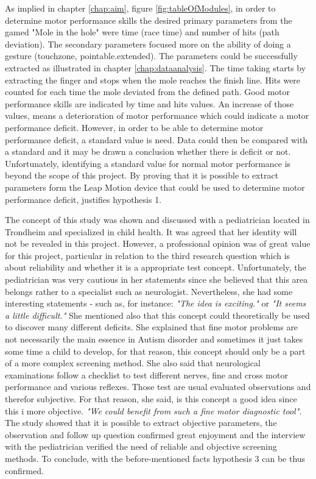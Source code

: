As implied in chapter \ref{chap:aim}, figure \ref{fig:tableOfModules}, in order to determine motor performance skills
the desired primary parameters from the gamed "Mole in the hole" were time (race time) and number of hits (path deviation). The secondary parameters focused more on the ability of doing a gesture (touchzone, pointable.extended). The parameters could be successfully extracted as illustrated in chapter \ref{chap:dataanalysis}. The time taking starts by extracting the finger and stops when the mole reaches the finish line. Hits were counted for each time the mole deviated from the defined path. Good motor performance skills are indicated by time and hits values. An increase of those values, means a deterioration of motor performance which could indicate a motor performance deficit. However, in order to be able to determine motor performance deficit, a standard value is need. Data could then be compared with a standard and it may be drawn a conclusion whether there is deficit or not. Unfortunately, identifying a standard value for normal motor performance is beyond the scope of this project. 
By proving that it is possible to extract parameters form the Leap Motion device that could be used to determine motor performance deficit, justifies hypothesis 1. 

The concept of this study was shown and discussed with a pediatrician located in Trondheim and specialized in child health. It was agreed that her identity will not be revealed in this project. However, a professional opinion was of great value for this project, particular in relation to the third research question which is about reliability and whether it is a appropriate test concept. Unfortunately, the pediatrician was very cautious in her statements since she believed that this area belongs rather to a specialist such as neurologist. Nevertheless, she had some interesting statements - such as, for instance: \textit{"The idea is exciting."} or \textit{"It seems a little difficult."} She mentioned also that this concept could theoretically be used to discover many different deficits. She explained that fine motor problems are not necessarily the main essence in Autism disorder and sometimes it just takes some time a child to develop, for that reason, this concept should only be a part of a more complex screening method. She also said that neurological examinations follow a checklist to test different nerves, fine and cross motor performance and various reflexes. Those test are usual evaluated observations and therefor subjective. For that reason, she said, is this concept a good idea since this i more objective. \textit{"We could benefit from such a fine motor diagnostic tool".} 
The study showed that it is possible to extract objective parameters, the observation and follow up question confirmed great enjoyment and the interview with the pediatrician verified the need of reliable and objective screening methods. To conclude, with the before-mentioned facts hypothesis 3 can be thus confirmed. 




